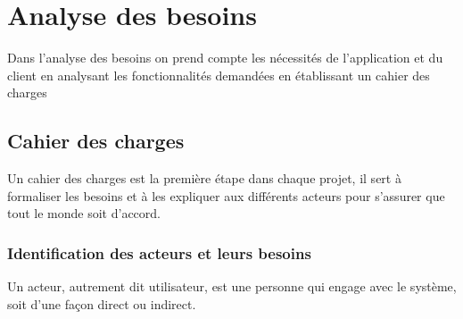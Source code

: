 

\chapter{Analyse des besoins}
Dans l'analyse des besoins on prend compte les nécessités de l'application et du client en analysant les fonctionnalités demandées en établissant un cahier des charges

\section{Cahier des charges}
Un cahier des charges est la première étape dans chaque projet, il
sert à formaliser les besoins et à les expliquer aux différents acteurs pour s’assurer que tout le monde soit d’accord.

\subsection{Identification des acteurs et leurs besoins}
Un acteur, autrement dit utilisateur, est une personne qui engage avec le système, soit d'une façon direct ou indirect.

